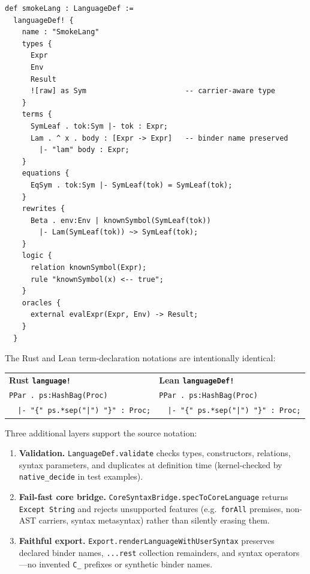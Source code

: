 \documentclass[11pt]{article}
\newcommand{\code}[1]{\texttt{#1}}
\begin{document}
\begin{lstlisting}[language={},caption={Lean \code{languageDef!} example
  (\texttt{LanguageDefDSLTests.lean})}]
def smokeLang : LanguageDef :=
  languageDef! {
    name : "SmokeLang"
    types {
      Expr
      Env
      Result
      ![raw] as Sym                       -- carrier-aware type
    }
    terms {
      SymLeaf . tok:Sym |- tok : Expr;
      Lam . ^ x . body : [Expr -> Expr]   -- binder name preserved
        |- "lam" body : Expr;
    }
    equations {
      EqSym . tok:Sym |- SymLeaf(tok) = SymLeaf(tok);
    }
    rewrites {
      Beta . env:Env | knownSymbol(SymLeaf(tok))
        |- Lam(SymLeaf(tok)) ~> SymLeaf(tok);
    }
    logic {
      relation knownSymbol(Expr);
      rule "knownSymbol(x) <-- true";
    }
    oracles {
      external evalExpr(Expr, Env) -> Result;
    }
  }
\end{lstlisting}

The Rust and Lean term-declaration notations are intentionally identical:
%
\begin{center}
\begin{tabular}{@{}l@{\qquad}l@{}}
\textbf{Rust \code{language!}} & \textbf{Lean \code{languageDef!}} \\[2pt]
\code{PPar~.~ps:HashBag(Proc)} & \code{PPar~.~ps:HashBag(Proc)} \\
\code{~~|- "\{" ps.*sep("|") "\}" : Proc;}
  & \code{~~|- "\{" ps.*sep("|") "\}" : Proc;}
\end{tabular}
\end{center}

Three additional layers support the source notation:
\begin{enumerate}
\item \textbf{Validation.}
  \code{LanguageDef.validate} checks types, constructors, relations,
  syntax parameters, and duplicates at definition time (kernel-checked by
  \code{native\_decide} in test examples).
\item \textbf{Fail-fast core bridge.}
  \code{CoreSyntaxBridge.specToCoreLanguage} returns \code{Except String}
  and rejects unsupported features (e.g.\ \code{forAll} premises,
  non-AST carriers, syntax metasyntax) rather than silently erasing them.
\item \textbf{Faithful export.}
  \code{Export.renderLanguageWithUserSyntax} preserves declared binder names,
  \code{...rest} collection remainders, and syntax operators---no invented
  \code{C\_} prefixes or synthetic binder names.
\end{enumerate}
\end{document}
